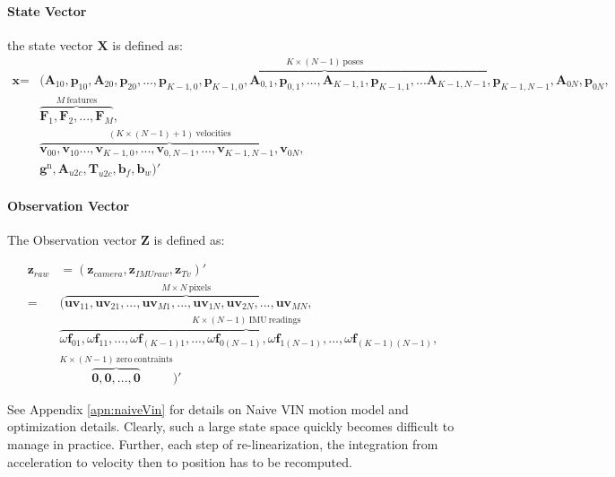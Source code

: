 \documentclass[12pt]{article}   %
\begin{document}
\paragraph{State Vector}
the state vector $\textbf{X}$ is defined as:
\begin{align*}
\textbf{x} = &(\overbrace{\textbf{A}_{10}, \textbf{p}_{10}, \textbf{A}_{20}, \textbf{p}_{20},... ,\textbf{p}_{K-1,0}, \textbf{p}_{K-1,0},\textbf{A}_{0,1}, \textbf{p}_{0,1},...,\textbf{A}_{K-1,1}, \textbf{p}_{K-1,1},... \textbf{A}_{K-1,N-1}, \textbf{p}_{K-1,N-1},\textbf{A}_{0N}, \textbf{p}_{0N}}^{K \times (N - 1) \ {\mathrm{ poses}}},\\
	 &\overbrace{\textbf{F}_{1},\textbf{F}_{2}, ..., \textbf{F}_{M}}^{M \ {\mathrm{ features}}},\\
	 &\overbrace{\textbf{v}_{00},\textbf{v}_{10} ...,\textbf{v}_{K-1,0}, ...,\textbf{v}_{0,N-1},...,\textbf{v}_{K-1,N-1}, \textbf{v}_{0N}}^{(K \times (N-1)+1)  \ {\mathrm{ velocities}}},\\
	 &\textbf{g}^{\mathrm{n}}, \textbf{A}_{u2c}, \textbf{T}_{u2c}, \textbf{b}_f, \textbf{b}_w )' 
\end{align*}

\paragraph{Observation Vector}
The Observation vector $\textbf{Z}$ is defined as:

\begin{align}
\textbf{z}_{raw} &= (\textbf{z}_{camera}, \textbf{z}_{IMUraw}, \textbf{z}_{Tv})' \nonumber \\
=& (\overbrace{\textbf{uv}_{11}, \textbf{uv}_{21}, ... , \textbf{uv}_{M1}, ..., \textbf{uv}_{1N}, \textbf{uv}_{2N}, ... , \textbf{uv}_{MN}}^{M \times N \ {\mathrm{pixels}}}, \nonumber \\ 
& \overbrace{\omega\textbf{f}_{01}, \omega\textbf{f}_{11}, ... , \omega\textbf{f}_{(K-1)1}, ..., \omega\textbf{f}_{0(N-1)}, \omega\textbf{f}_{1(N-1)}, ... , \omega\textbf{f}_{(K-1)(N-1)}}^{K \times (N-1) \ {\mathrm{IMU \ readings}}}, \\
& \overbrace{\textbf{0}, \textbf{0}, ... , \textbf{0}}^{K \times (N-1)  \ {\mathrm{ zero \ contraints}}})' 
\end{align}

See Appendix \ref{apn:naiveVin} for details on Naive VIN motion model and optimization details.
Clearly, such a large state space quickly becomes difficult to manage in practice. Further, each step of re-linearization, the integration from acceleration to velocity then to position has to be recomputed.
\end{document}
